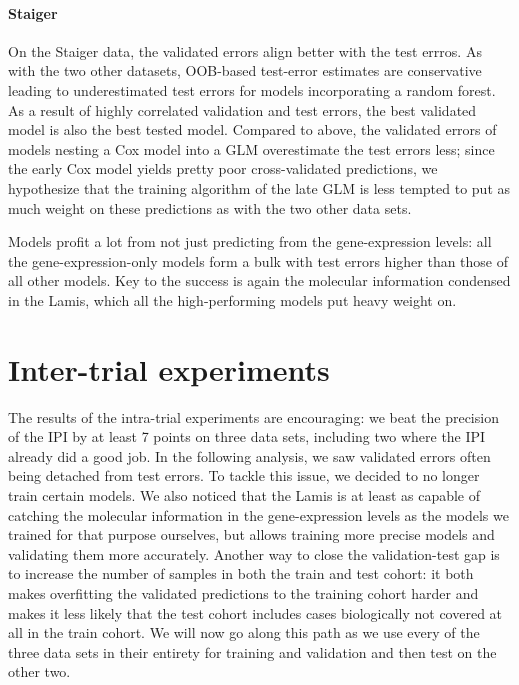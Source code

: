 \paragraph{Staiger}

On the Staiger data, the validated errors align better with the test errros. As with the two other 
datasets, OOB-based test-error estimates are conservative leading to underestimated test errors 
for models incorporating a random forest. As a result of highly correlated validation and test 
errors, the best validated model is also the best tested model. Compared to above, the validated errors 
of models nesting a Cox model into a GLM overestimate the test errors less; since the early Cox 
model yields pretty poor cross-validated predictions, we hypothesize that the training 
algorithm of the late GLM is less tempted to put as much weight on these predictions as with the 
two other data sets.

Models profit a lot from not just predicting from the gene-expression levels: all the 
gene-expression-only models form a bulk with test errors higher than those of all other models. 
Key to the success is again the molecular information condensed in the Lamis, which all the 
high-performing models put heavy weight on.

\section{Inter-trial experiments}\label{sec:inter-trial}

The results of the intra-trial experiments are encouraging: we beat the precision of the IPI by 
at least \num{7} points on three data sets, including two where the IPI already did a good job. 
In the following analysis, we saw validated errors often being detached from test errors. To tackle 
this issue, we decided to no longer train certain models. We also noticed that the Lamis is at least 
as capable of catching the molecular information in the gene-expression levels as the models
we trained for that purpose ourselves, but allows training more precise models and validating them 
more accurately. Another way to close the validation-test gap is to increase the number of samples 
in both the train and test cohort: it both makes overfitting the validated predictions to the 
training cohort harder and makes it less likely that the test cohort includes cases biologically 
not covered at all in the train cohort. We will now go along this path as we use every of the 
three data sets in their entirety for training and validation and then test on the other two.

